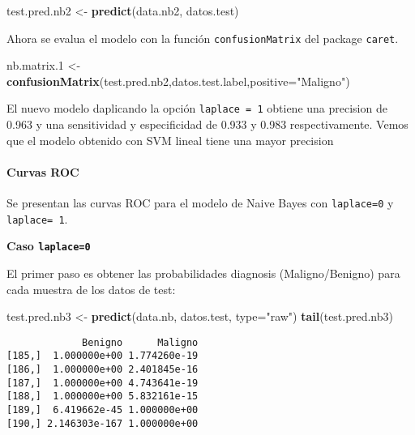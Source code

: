 \documentclass[
]{article}
\newenvironment{Shaded}{\begin{snugshade}}{\end{snugshade}}
\newcommand{\DataTypeTok}[1]{\textcolor[rgb]{0.13,0.29,0.53}{#1}}
\newcommand{\FloatTok}[1]{\textcolor[rgb]{0.00,0.00,0.81}{#1}}
\newcommand{\KeywordTok}[1]{\textcolor[rgb]{0.13,0.29,0.53}{\textbf{#1}}}
\newcommand{\NormalTok}[1]{#1}
\newcommand{\StringTok}[1]{\textcolor[rgb]{0.31,0.60,0.02}{#1}}
\let\oldparagraph\paragraph
\renewcommand{\paragraph}[1]{\oldparagraph{#1}\mbox{}}
\begin{document}
\begin{Shaded}
\begin{Highlighting}[]
\NormalTok{test.pred.nb2 <-}\StringTok{ }\KeywordTok{predict}\NormalTok{(data.nb2, datos.test)}
\end{Highlighting}
\end{Shaded}

Ahora se evalua el modelo con la función \texttt{confusionMatrix} del
package \texttt{caret}.

\begin{Shaded}
\begin{Highlighting}[]
\NormalTok{nb.matrix}\FloatTok{.1}\NormalTok{ <-}\StringTok{ }\KeywordTok{confusionMatrix}\NormalTok{(test.pred.nb2,datos.test.label,}\DataTypeTok{positive=}\StringTok{"Maligno"}\NormalTok{)}
\end{Highlighting}
\end{Shaded}

El nuevo modelo daplicando la opción \texttt{laplace\ =\ 1} obtiene una
precision de 0.963 y una sensitividad y especificidad de 0.933 y 0.983
respectivamente. Vemos que el modelo obtenido con SVM lineal tiene una
mayor precision

\hypertarget{curvas-roc}{%
\paragraph{Curvas ROC}\label{curvas-roc}}

Se presentan las curvas ROC para el modelo de Naive Bayes con
\texttt{laplace=0} y \texttt{laplace=\ 1}.

\textbf{Caso \texttt{laplace=0}}

El primer paso es obtener las probabilidades diagnosis (Maligno/Benigno)
para cada muestra de los datos de test:

\begin{Shaded}
\begin{Highlighting}[]
\NormalTok{test.pred.nb3 <-}\StringTok{ }\KeywordTok{predict}\NormalTok{(data.nb, datos.test, }\DataTypeTok{type=}\StringTok{"raw"}\NormalTok{)}
\KeywordTok{tail}\NormalTok{(test.pred.nb3)}
\end{Highlighting}
\end{Shaded}

\begin{verbatim}
             Benigno      Maligno
[185,]  1.000000e+00 1.774260e-19
[186,]  1.000000e+00 2.401845e-16
[187,]  1.000000e+00 4.743641e-19
[188,]  1.000000e+00 5.832161e-15
[189,]  6.419662e-45 1.000000e+00
[190,] 2.146303e-167 1.000000e+00
\end{verbatim}
\end{document}
